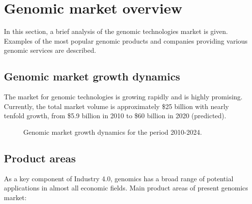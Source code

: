\section{Genomic market overview}
\begin{overview}
  In this section, a brief analysis of the genomic technologies market is given. Examples of the most popular genomic products and companies providing various genomic services are described.
\end{overview}

\subsection{Genomic market growth dynamics}
The market for genomic technologies is growing rapidly and is highly promising. Currently, the total market volume is approximately \$25 billion with nearly tenfold growth, from \$5.9 billion in 2010 to \$60 billion in 2020 (predicted).


\begin{figure}[H] \centering
{}
\caption{Genomic market growth dynamics for the period 2010-2024.}
\end{figure}



\subsection{Product areas}
As a key component of Industry 4.0, genomics has a broad range of potential applications in almost all economic fields.
Main product areas of present genomics market:

